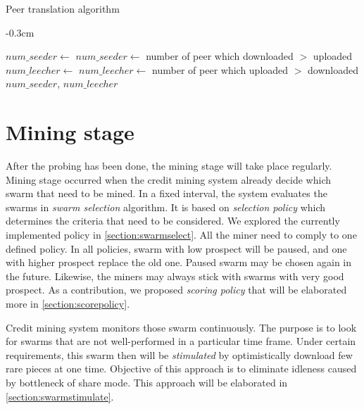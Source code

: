 \begin{algorithm}[t]
	\caption{Peer translation algorithm}
	\label{alg:peertrans1}
	\begin{adjustwidth}{}{-0.3cm}
	\begin{algorithmic}[1]
		\Statex
		\State $num\_seeder \gets $ 
		\State $num\_seeder \gets $ number of peer which downloaded $>$ uploaded
		\EndIf
		\State $num\_leecher \gets $  \label{alg:peertrans1:pickleech}
		\State $num\_leecher \gets $ number of peer which uploaded $>$ downloaded
		\EndIf
		\State \Return $num\_seeder$, $num\_leecher$
		\EndFunction
	\end{algorithmic}
	\end{adjustwidth}
\end{algorithm}

\section{Mining stage}
After the probing has been done, the mining stage will take place regularly. Mining stage occurred when the credit mining system already decide which swarm that need to be mined. In a fixed interval, the system evaluates the swarms in \textit{swarm selection} algorithm. It is based on \textit{selection policy} which determines the criteria that need to be considered. We explored the currently implemented policy in \ref{section:swarmselect}. All the miner need to comply to one defined policy. In all policies, swarm with low prospect will be paused, and one with higher prospect replace the old one. Paused swarm may be chosen again in the future. Likewise, the miners may always stick with swarms with very good prospect. As a contribution, we proposed \textit{scoring policy} that will be elaborated more in \ref{section:scorepolicy}.

Credit mining system monitors those swarm continuously. The purpose is to look for swarms that are not well-performed in a particular time frame. Under certain requirements, this swarm then will be \textit{stimulated} by optimistically download few rare pieces at one time. Objective of this approach is to eliminate idleness caused by bottleneck of share mode. This approach will be elaborated in \ref{section:swarmstimulate}.

